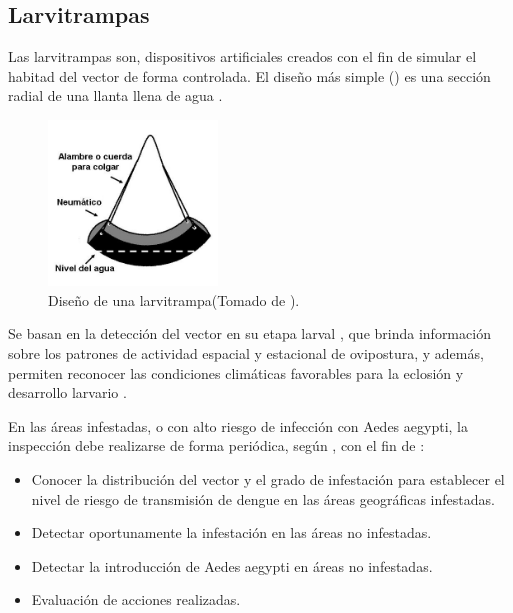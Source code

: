 \subsection{Larvitrampas}
\label{sec:densidad-vectorial-larvitrampas}
Las larvitrampas son, dispositivos artificiales creados con el fin de simular el habitad del
vector de forma controlada. El diseño más simple () es una sección
radial de una llanta llena de agua \cite{world2009dengue}.

\begin{figure}
\centering
\includegraphics[width=0.4\textwidth]{capitulo-3/graphics/larvitrampa.png}
\caption{\label{fig:cap3-larvitrampas} Diseño de una larvitrampa(Tomado de
\cite{manualControlArg2009}).}
\end{figure}

Se basan en la detección del vector en su etapa larval
\cite{manualControlArg2009, MARQUES1993}, que brinda información sobre los patrones de actividad
espacial y estacional de ovipostura, y además, permiten reconocer las condiciones climáticas
favorables para la eclosión y desarrollo larvario \cite{manualControlArg2009}.

En las áreas infestadas, o con alto riesgo de infección con Aedes aegypti, la inspección debe
realizarse de forma periódica, según \cite{manualControlArg2009}, con el fin de :

\begin{itemize}
    \item Conocer la distribución del vector y el grado de infestación para establecer el nivel de riesgo de transmisión de dengue en las áreas geográficas infestadas.
    \item Detectar oportunamente la infestación en las áreas no infestadas.
    \item Detectar la introducción de Aedes aegypti en áreas no infestadas.
    \item Evaluación de acciones realizadas.
\end{itemize}

